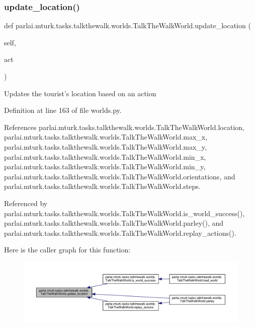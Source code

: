 \subsubsection{\texorpdfstring{update\+\_\+location()}{update\_location()}}
{\footnotesize\ttfamily def parlai.\+mturk.\+tasks.\+talkthewalk.\+worlds.\+Talk\+The\+Walk\+World.\+update\+\_\+location (\begin{DoxyParamCaption}\item[{}]{self,  }\item[{}]{act }\end{DoxyParamCaption})}

\begin{DoxyVerb}Updates the tourist's location based on an action\end{DoxyVerb}
 

Definition at line 163 of file worlds.\+py.



References parlai.\+mturk.\+tasks.\+talkthewalk.\+worlds.\+Talk\+The\+Walk\+World.\+location, parlai.\+mturk.\+tasks.\+talkthewalk.\+worlds.\+Talk\+The\+Walk\+World.\+max\+\_\+x, parlai.\+mturk.\+tasks.\+talkthewalk.\+worlds.\+Talk\+The\+Walk\+World.\+max\+\_\+y, parlai.\+mturk.\+tasks.\+talkthewalk.\+worlds.\+Talk\+The\+Walk\+World.\+min\+\_\+x, parlai.\+mturk.\+tasks.\+talkthewalk.\+worlds.\+Talk\+The\+Walk\+World.\+min\+\_\+y, parlai.\+mturk.\+tasks.\+talkthewalk.\+worlds.\+Talk\+The\+Walk\+World.\+orientations, and parlai.\+mturk.\+tasks.\+talkthewalk.\+worlds.\+Talk\+The\+Walk\+World.\+steps.



Referenced by parlai.\+mturk.\+tasks.\+talkthewalk.\+worlds.\+Talk\+The\+Walk\+World.\+is\+\_\+world\+\_\+success(), parlai.\+mturk.\+tasks.\+talkthewalk.\+worlds.\+Talk\+The\+Walk\+World.\+parley(), and parlai.\+mturk.\+tasks.\+talkthewalk.\+worlds.\+Talk\+The\+Walk\+World.\+replay\+\_\+actions().

Here is the caller graph for this function\+:
\nopagebreak
\begin{figure}[H]
\begin{center}
\leavevmode
\includegraphics[width=350pt]{classparlai_1_1mturk_1_1tasks_1_1talkthewalk_1_1worlds_1_1TalkTheWalkWorld_a30adb3fe817fef8f40a6a2f61773972d_icgraph}
\end{center}
\end{figure}


